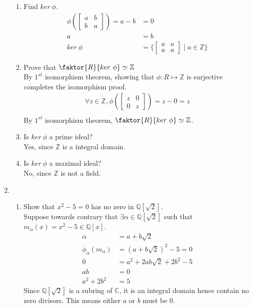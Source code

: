 \documentclass[12pt]{article}
\begin{document}
\begin{enumerate}
\begin{enumerate}
			\item Find $ker\ \phi$.
				\begin{align*}
					\phi\left(\begin{bmatrix} a & b\\ b & a \end{bmatrix}\right) = a-b &= 0\\
					a &= b\\
					ker\ \phi &= \bigg\{\begin{bmatrix} a & a\\ a & a \end{bmatrix} \mid
					a \in \mathbb{Z}\bigg\}
				\end{align*}

			\item Prove that $\faktor{R}{ker\ \phi} \simeq \mathbb{Z}$\\
				By $1^{st}$ isomorphism theorem, showing that $\phi: R \mapsto
				\mathbb{Z}$ is surjective completes the isomorphism proof.
				\begin{align*}
					\forall z \in \mathbb{Z}, \phi\left(\begin{bmatrix} z & 0\\ 0 & z
					\end{bmatrix}\right) = z-0 = z\\
				\end{align*}
				By $1^{st}$ isomorphism theorem, $\faktor{R}{ker\ \phi} \simeq
				\mathbb{Z}$.

			\item Is $ker\ \phi$ a prime ideal?\\
				Yes, since $\mathbb{Z}$ is a integral domain.
			\item Is $ker\ \phi$ a maximal ideal?\\
				No, since $\mathbb{Z}$ is not a field.
		\end{enumerate}

	\item
		\begin{enumerate}
			\item Show that $x^2 - 5 = 0$ has no zero in $\mathbb{Q}[\sqrt{2}]$.\\
			Suppose towards contrary that $\exists \alpha \in \mathbb{Q}[\sqrt{2}]$
			such that $m_\alpha(x) = x^2-5 \in \mathbb{Q}[x]$. 
			\begin{align*}
				\alpha &= a+b\sqrt{2}\\
				\phi_\alpha(m_\alpha) &= (a+b\sqrt{2})^2 -5=0\\
				0 &= a^2 + 2ab\sqrt{2} + 2b^2 - 5\\
				ab &= 0\\
				a^2 + 2b^2 &= 5
			\end{align*}
			Since $\mathbb{Q}[\sqrt{2}]$ is a subring of $\mathbb{C}$, it is an
				integral domain hence contain no zero divisors. This means either $a$ or
				$b$ must be 0.

\end{enumerate}
\end{enumerate}
\end{document}

